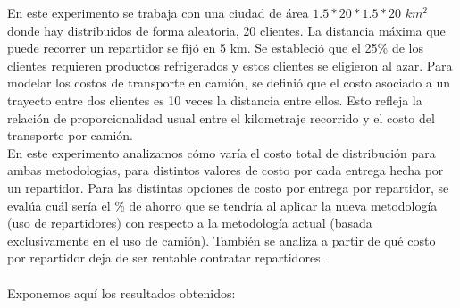 \documentclass{article}
\begin{document}
En este experimento se trabaja con una ciudad de área $1.5 * 20 * 1.5 * 20$  $km^{2}$ donde hay distribuidos de forma aleatoria, 20 clientes. La distancia máxima que puede recorrer un repartidor se fijó en 5 km. 
Se estableció que el 25\% de los clientes requieren productos refrigerados y estos clientes se eligieron al azar. 
Para modelar los costos de transporte en camión, se definió que el costo asociado a un trayecto entre dos clientes es 10 veces la distancia entre ellos. Esto refleja la relación de proporcionalidad usual entre el kilometraje recorrido y el costo del transporte por camión. \\
En este experimento analizamos cómo varía el costo total de distribución para ambas metodologías, para distintos valores de costo por cada entrega hecha por un repartidor. Para las distintas opciones de costo por entrega por repartidor, se evalúa cuál sería el \% de ahorro que se tendría al aplicar la nueva metodología (uso de repartidores) con respecto a la metodología actual (basada exclusivamente en el uso de camión). También se analiza a partir de qué costo por repartidor deja de ser rentable contratar repartidores. \\
\\
Exponemos aquí los resultados obtenidos: 

\begin{table}[H]
\centering
{}
\caption{Comparación de costos entre metodologías para distintos costos por repartidor}
\end{table}
\end{document}
